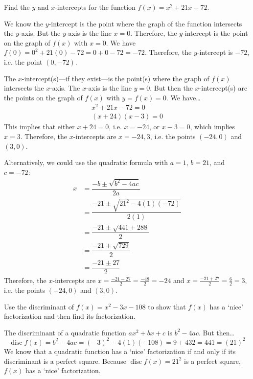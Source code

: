 \documentclass[12pt,letterpaper]{exam}
\DeclareMathOperator{\disc}{disc}
\begin{document}
\begin{questions}
\newpage
\question[10] Find the $y$ and $x$-intercepts for the function $f(x)= x^2 + 21x - 72$. \pspace

\sol We know the $y$-intercept is the point where the graph of the function intersects the $y$-axis. But the $y$-axis is the line $x= 0$. Therefore, the $y$-intercept is the point on the graph of $f(x)$ with $x= 0$. We have $f(0)= 0^2 + 21(0) - 72= 0 + 0 - 72= -72$. Therefore, the $y$-intercept is $-72$, i.e. the point $(0, -72)$. \pspace

The $x$-intercept(s)---if they exist---is the point(s) where the graph of $f(x)$ intersects the $x$-axis. The $x$-axis is the line $y= 0$. But then the $x$-intercept(s) are the points on the graph of $f(x)$ with $y= f(x)= 0$. We have\dots	
	\[
	\begin{aligned}
	x^2 + 21x - 72= 0 \\
	(x + 24)(x - 3)= 0 
	\end{aligned}
	\]
This implies that either $x + 24= 0$, i.e. $x= -24$, or $x - 3= 0$, which implies $x= 3$. Therefore, the $x$-intercepts are $x= -24, 3$, i.e. the points $(-24, 0)$ and $(3, 0)$. \pspace

Alternatively, we could use the quadratic formula with $a= 1$, $b= 21$, and $c= -72$: 
	\[
	\begin{aligned}
	x&= \dfrac{-b \pm \sqrt{b^2 - 4ac}}{2a} \\[0.3cm]
	&= \dfrac{-21 \pm \sqrt{21^2 - 4(1)(-72)}}{2(1)} \\[0.3cm]
	&= \dfrac{-21 \pm \sqrt{441 + 288}}{2} \\[0.3cm]
	&= \dfrac{-21 \pm \sqrt{729}}{2} \\[0.3cm]
	&= \dfrac{-21 \pm 27}{2}
	\end{aligned}
	\]
Therefore, the $x$-intercepts are $x= \frac{-21 - 27}{2}= \frac{-48}{2}= -24$ and $x= \frac{-21 + 27}{2}= \frac{6}{2}= 3$, i.e. the points $(-24, 0)$ and $(3, 0)$. 



\newpage
\question[10] Use the discriminant of $f(x)= x^2 - 3x - 108$ to show that $f(x)$ has a `nice' factorization and then find its factorization. \pspace

\sol The discriminant of a quadratic function $ax^2 + bx + c$ is $b^2 - 4ac$. But then\dots
	\[
	\disc f(x)= b^2 - 4ac= (-3)^2 - 4(1)(-108)= 9 + 432= 441= (21)^2
	\]
We know that a quadratic function has a `nice' factorization if and only if its discriminant is a perfect square. Because $\disc f(x)= 21^2$ is a perfect square, $f(x)$ has a `nice' factorization. \pspace


\end{questions}
\end{document}
